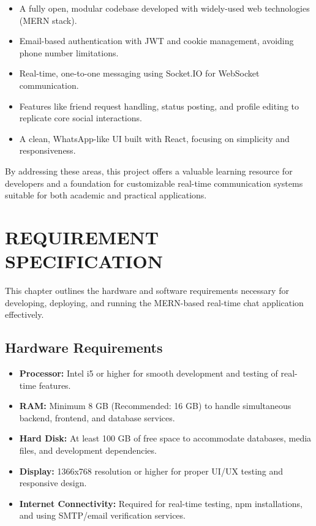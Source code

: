 \documentclass[12pt,a4paper]{report}
\begin{document}
\begin{itemize}
    \item A fully open, modular codebase developed with widely-used web technologies (MERN stack).
    \item Email-based authentication with JWT and cookie management, avoiding phone number limitations.
    \item Real-time, one-to-one messaging using Socket.IO for WebSocket communication.
    \item Features like friend request handling, status posting, and profile editing to replicate core social interactions.
    \item A clean, WhatsApp-like UI built with React, focusing on simplicity and responsiveness.
\end{itemize}

By addressing these areas, this project offers a valuable learning resource for developers and a foundation for customizable real-time communication systems suitable for both academic and practical applications.



\newpage

\newpage




\chapter{REQUIREMENT SPECIFICATION}

This chapter outlines the hardware and software requirements necessary for developing, deploying, and running the MERN-based real-time chat application effectively.

\section{Hardware Requirements}
\begin{itemize}
    \item \textbf{Processor:} Intel i5 or higher for smooth development and testing of real-time features.
    \item \textbf{RAM:} Minimum 8 GB (Recommended: 16 GB) to handle simultaneous backend, frontend, and database services.
    \item \textbf{Hard Disk:} At least 100 GB of free space to accommodate databases, media files, and development dependencies.
    \item \textbf{Display:} 1366x768 resolution or higher for proper UI/UX testing and responsive design.
    \item \textbf{Internet Connectivity:} Required for real-time testing, npm installations, and using SMTP/email verification services.
\end{itemize}
\end{document}
